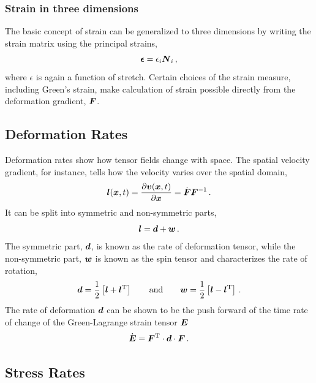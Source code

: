 \documentclass[10pt,letterpaper,oneside]{report}
\newcommand{\ten}[1]{\mbox{\boldmath $#1$}{}}
\newcommand{\scas}[1]{\mbox{{\scriptsize{${\rm{#1}}$}}}{}}
\begin{document}
\subsubsection{Strain in three dimensions}
The basic concept of strain can be generalized to three dimensions by writing the strain matrix using the principal strains, 
\begin{equation}
\ten{ \epsilon } = \epsilon_i \ten{N}_i \, ,
\end{equation}
where $\epsilon$ is again a function of stretch.  Certain choices of the strain measure, including Green's strain, make calculation of strain possible directly from the deformation gradient, $\ten{F}$.  

\subsection{Deformation Rates}

Deformation rates show how tensor fields change with space.  The spatial velocity gradient, for instance, tells how the velocity varies over the spatial domain, 
\begin{equation}
\ten{l} (\ten{x}, t) 
= \frac{\partial \ten{v} (\ten{x}, t) }{\partial\ten{x} } 
= \dot{\ten{F}} \ten{F}^{-1} \, . 
\end{equation}
It can be split into symmetric and non-symmetric parts, 
\begin{equation}
\ten{l} = \ten{d} + \ten{w} \, . 
\end{equation}
The symmetric part, $\ten{d}$, is known as the rate of deformation tensor, while the non-symmetric part, $\ten{w}$ is known as the spin tensor and characterizes the rate of rotation,
\begin{equation}
\ten{d} = \frac{1}{2} \left[ \ten{l} + \ten{l}^{\scas{T}} \right] 
\qquad \mbox{and} \qquad
\ten{w} = \frac{1}{2} \left[ \ten{l} - \ten{l}^{\scas{T}} \right] \, . 
\end{equation}
The rate of deformation $\ten{d}$ can be shown to be the push forward of the time rate of change of the Green-Lagrange strain tensor $\ten{E}$
\begin{equation}
\dot{\ten{E}} = \ten{F}^{\scas{T}} \cdot \ten{d} \cdot \ten{F} \, .
\end{equation}


\subsection{Stress Rates}
\end{document}
